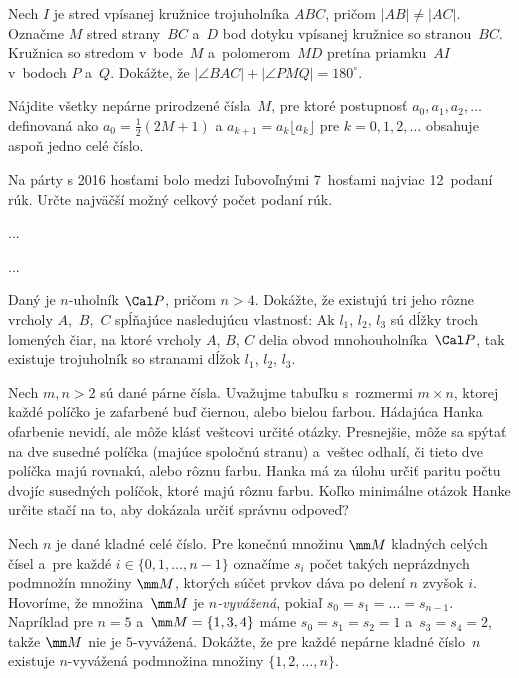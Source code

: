 {%
Nech $I$ je stred vpísanej kružnice trojuholníka $ABC$, pričom $|AB|\ne |AC|$. Označme $M$ stred strany~$BC$ a~$D$ bod dotyku vpísanej kružnice so stranou~$BC$. Kružnica so stredom v~bode~$M$ a~polomerom~$MD$ pretína priamku~$AI$ v~bodoch $P$ a~$Q$. Dokážte, že $|\angle BAC|+|\angle PMQ|=180^\circ$.}

{%
Nájdite všetky nepárne prirodzené čísla~$M$, pre ktoré postupnosť $a_0,a_1,a_2,\dots$ definovaná ako $a_0=\frac12(2M+1)$ a $a_{k+1}=a_k\lfloor a_k\rfloor$ pre $k=0,1,2,\dots$ obsahuje aspoň jedno celé číslo.}

{%
Na párty s 2016 hosťami bolo medzi ľubovoľnými 7~hosťami najviac 12~podaní rúk. Určte najväčší možný celkový počet podaní rúk.}

{%
...}

{%
...}

{%
Daný je $n$-uholník $\Cal P$, pričom $n>4$. Dokážte, že existujú tri jeho rôzne vrcholy $A$,~$B$,~$C$ spĺňajúce nasledujúcu vlastnosť:
Ak $l_1$, $l_2$, $l_3$ sú dĺžky troch lomených čiar, na ktoré vrcholy $A$, $B$, $C$ delia obvod mnohouholníka~$\Cal P$, tak existuje trojuholník so stranami dĺžok $l_1$, $l_2$, $l_3$.}

{%
Nech $m,n > 2$ sú dané párne čísla. Uvažujme tabuľku s~rozmermi $m \times n$, ktorej každé políčko je zafarbené buď čiernou, alebo bielou farbou. Hádajúca Hanka ofarbenie nevidí, ale môže klásť veštcovi určité otázky. Presnejšie, môže sa spýtať na dve susedné políčka (majúce spoločnú stranu) a~veštec odhalí, či tieto dve políčka majú rovnakú, alebo rôznu farbu. Hanka má za úlohu určiť paritu počtu dvojíc susedných políčok, ktoré majú rôznu farbu. Koľko minimálne otázok Hanke určite stačí na to, aby dokázala určiť správnu odpoveď?}

{%
Nech $n$ je dané kladné celé číslo. Pre konečnú množinu $\mm M$ kladných celých čísel a~pre každé $i \in \{0, 1, \dots, n-1\}$ označíme $s_i$ počet takých neprázdnych podmnožín množiny $\mm M$, ktorých súčet prvkov dáva po delení $n$ zvyšok $i$. Hovoríme, že množina~$\mm M$ je {\it $n$-vyvážená}, pokiaľ $s_0 = s_1 = \dots = s_{n-1}$. Napríklad pre $n=5$ a~$\mm M=\{1,3,4\}$ máme $s_0 = s_1 = s_2 = 1$ a~$s_3 = s_4 = 2$, takže $\mm M$ nie je $5$-vyvážená.
Dokážte, že pre každé nepárne kladné číslo~$n$ existuje $n$-vyvážená podmnožina množiny $\{1, 2, \dots, n\}$.}

